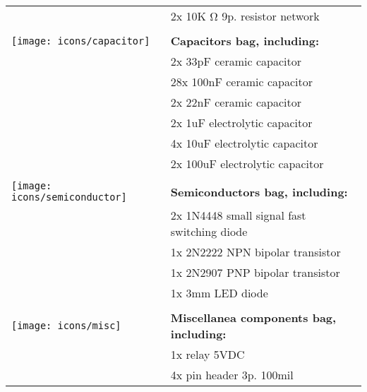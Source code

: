 \begin{longtable}{m{10mm}|l}
	                                      & 2x 10K \si{\ohm} 9p. resistor network                       \\
	                                      &                                                             \\
	\texttt{[image: icons/capacitor]}     & {\bf Capacitors bag, including:}                            \\
	                                      & 2x 33pF ceramic capacitor                                   \\
	                                      & 28x 100nF ceramic capacitor                                 \\
	                                      & 2x 22nF ceramic capacitor                                   \\
	                                      & 2x 1uF electrolytic capacitor                               \\
	                                      & 4x 10uF electrolytic capacitor                              \\
	                                      & 2x 100uF electrolytic capacitor                             \\
	                                      &                                                             \\
	\texttt{[image: icons/semiconductor]} & {\bf Semiconductors bag, including:}                        \\
	                                      & 2x 1N4448 small signal fast switching diode                 \\
	                                      & 1x 2N2222 NPN bipolar transistor                            \\
	                                      & 1x 2N2907 PNP bipolar transistor                            \\
	                                      & 1x 3mm LED diode                                            \\
	                                      &                                                             \\
	\texttt{[image: icons/misc]}          & {\bf Miscellanea components bag, including:}                \\
	                                      & 1x relay 5VDC                                               \\
	                                      & 4x pin header 3p. 100mil                                    \\

\end{longtable}
